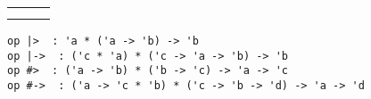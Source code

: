 \begin{isabellebody}
\begin{isamarkuptext}
  \medskip
  \begin{tabular}{lll}
  \isa{{\isaliteral{28}{\isacharparenleft}}x{\isaliteral{2C}{\isacharcomma}}\ y{\isaliteral{29}{\isacharparenright}}\ {\isaliteral{7C}{\isacharbar}}{\isaliteral{2D}{\isacharminus}}{\isaliteral{3E}{\isachargreater}}\ f} & \isa{{\isaliteral{5C3C65717569763E}{\isasymequiv}}} & \isa{f\ x\ y} \\
  \isa{{\isaliteral{28}{\isacharparenleft}}f\ {\isaliteral{23}{\isacharhash}}{\isaliteral{2D}{\isacharminus}}{\isaliteral{3E}{\isachargreater}}\ g{\isaliteral{29}{\isacharparenright}}\ x} & \isa{{\isaliteral{5C3C65717569763E}{\isasymequiv}}} & \isa{x\ {\isaliteral{7C}{\isacharbar}}{\isaliteral{3E}{\isachargreater}}\ f\ {\isaliteral{7C}{\isacharbar}}{\isaliteral{2D}{\isacharminus}}{\isaliteral{3E}{\isachargreater}}\ g} \\
  \end{tabular}
  \medskip%
\end{isamarkuptext}%
\isamarkuptrue%
%
\isadelimmlref
%
\endisadelimmlref
%
\isatagmlref
%
\begin{isamarkuptext}%
\begin{mldecls}
  \verb|op |\verb,|,\verb|>  : 'a * ('a -> 'b) -> 'b| \\
  \verb|op |\verb,|,\verb|->  : ('c * 'a) * ('c -> 'a -> 'b) -> 'b| \\
  \verb|op #>  : ('a -> 'b) * ('b -> 'c) -> 'a -> 'c| \\
  \verb|op #->  : ('a -> 'c * 'b) * ('c -> 'b -> 'd) -> 'a -> 'd| \\
  \end{mldecls}


\end{isamarkuptext}
\end{isabellebody}
